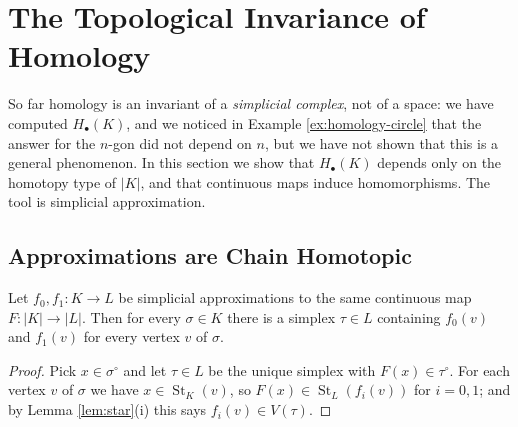 \documentclass[a4paper]{scrartcl}
\newcommand{\St}{\operatorname{St}}
\begin{document}
\section{The Topological Invariance of Homology}

So far homology is an invariant of a \emph{simplicial complex}, not of a space: we have
computed $H_\bullet(K)$, and we noticed in Example \ref{ex:homology-circle} that the
answer for the $n$-gon did not depend on $n$, but we have not shown that this is a
general phenomenon. In this section we show that $H_\bullet(K)$ depends only on the
homotopy type of $|K|$, and that continuous maps induce homomorphisms. The tool is
simplicial approximation.

\subsection{Approximations are Chain Homotopic}

\begin{lemma} \label{lem:two-approximations}
	Let $f_0, f_1: K \to L$ be simplicial approximations to the same continuous map $F: |K|\to|L|$. Then for every $\sigma \in K$ there is a simplex $\tau \in L$ containing $f_0(v)$ and $f_1(v)$ for every vertex $v$ of $\sigma$.
\end{lemma}
\begin{proof}
	Pick $x \in \sigma^\circ$ and let $\tau \in L$ be the unique simplex with $F(x)\in\tau^\circ$. For each vertex $v$ of $\sigma$ we have $x \in \St_K(v)$, so $F(x) \in \St_L(f_i(v))$ for $i = 0,1$; and by Lemma \ref{lem:star}(i) this says $f_i(v) \in V(\tau)$.
\end{proof}
\end{document}
